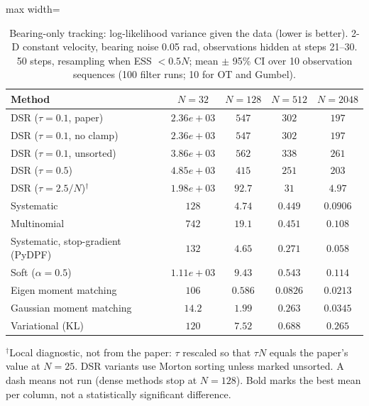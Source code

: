 \begin{table}[H]
\centering
\small
\caption{Bearing-only tracking: log-likelihood variance given the data (lower is better). 2-D constant velocity, bearing noise 0.05 rad, observations hidden at steps 21--30. 50 steps, resampling when ESS $<0.5N$; mean $\pm$ 95\% CI over 10 observation sequences (100 filter runs; 10 for OT and Gumbel).}
\label{tab:bearing-conditional_loglik_variance}
\begin{adjustbox}{max width=\linewidth}
\begin{tabular}{lcccc}
\toprule
Method & $N{=}32$ & $N{=}128$ & $N{=}512$ & $N{=}2048$ \\
\midrule
DSR ($\tau{=}0.1$, paper) & $2.36e+03$ & $547$ & $302$ & $197$ \\
DSR ($\tau{=}0.1$, no clamp) & $2.36e+03$ & $547$ & $302$ & $197$ \\
DSR ($\tau{=}0.1$, unsorted) & $3.86e+03$ & $562$ & $338$ & $261$ \\
DSR ($\tau{=}0.5$) & $4.85e+03$ & $415$ & $251$ & $203$ \\
DSR ($\tau{=}2.5/N$)$^\dagger$ & $1.98e+03$ & $92.7$ & $31$ & $4.97$ \\
\midrule
Systematic & $128$ & $4.74$ & $0.449$ & $0.0906$ \\
Multinomial & $742$ & $19.1$ & $0.451$ & $0.108$ \\
Systematic, stop-gradient (PyDPF) & $132$ & $4.65$ & $0.271$ & $0.058$ \\
Soft ($\alpha{=}0.5$) & $1.11e+03$ & $9.43$ & $0.543$ & $0.114$ \\
Eigen moment matching & $106$ & $\mathbf{0.586}$ & $\mathbf{0.0826}$ & $\mathbf{0.0213}$ \\
Gaussian moment matching & $\mathbf{14.2}$ & $1.99$ & $0.263$ & $0.0345$ \\
Variational (KL) & $120$ & $7.52$ & $0.688$ & $0.265$ \\
\bottomrule
\end{tabular}
\end{adjustbox}
\par\smallskip\parbox{0.95\linewidth}{\footnotesize $^\dagger$Local diagnostic, not from the paper: $\tau$ rescaled so that $\tau N$ equals the paper's value at $N{=}25$. DSR variants use Morton sorting unless marked unsorted. A dash means not run (dense methods stop at $N{=}128$). Bold marks the best mean per column, not a statistically significant difference.}
\end{table}

